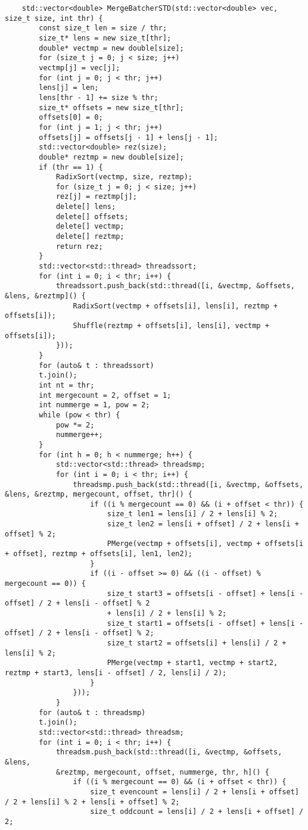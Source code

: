 \documentclass{report}
\begin{document}
\begin{lstlisting}
	std::vector<double> MergeBatcherSTD(std::vector<double> vec, size_t size, int thr) {
		const size_t len = size / thr;
		size_t* lens = new size_t[thr];
		double* vectmp = new double[size];
		for (size_t j = 0; j < size; j++)
		vectmp[j] = vec[j];
		for (int j = 0; j < thr; j++)
		lens[j] = len;
		lens[thr - 1] += size % thr;
		size_t* offsets = new size_t[thr];
		offsets[0] = 0;
		for (int j = 1; j < thr; j++)
		offsets[j] = offsets[j - 1] + lens[j - 1];
		std::vector<double> rez(size);
		double* reztmp = new double[size];
		if (thr == 1) {
			RadixSort(vectmp, size, reztmp);
			for (size_t j = 0; j < size; j++)
			rez[j] = reztmp[j];
			delete[] lens;
			delete[] offsets;
			delete[] vectmp;
			delete[] reztmp;
			return rez;
		}
		std::vector<std::thread> threadssort;
		for (int i = 0; i < thr; i++) {
			threadssort.push_back(std::thread([i, &vectmp, &offsets, &lens, &reztmp]() {
				RadixSort(vectmp + offsets[i], lens[i], reztmp + offsets[i]);
				Shuffle(reztmp + offsets[i], lens[i], vectmp + offsets[i]);
			}));
		}
		for (auto& t : threadssort)
		t.join();
		int nt = thr;
		int mergecount = 2, offset = 1;
		int nummerge = 1, pow = 2;
		while (pow < thr) {
			pow *= 2;
			nummerge++;
		}
		for (int h = 0; h < nummerge; h++) {
			std::vector<std::thread> threadsmp;
			for (int i = 0; i < thr; i++) {
				threadsmp.push_back(std::thread([i, &vectmp, &offsets, &lens, &reztmp, mergecount, offset, thr]() {
					if ((i % mergecount == 0) && (i + offset < thr)) {
						size_t len1 = lens[i] / 2 + lens[i] % 2;
						size_t len2 = lens[i + offset] / 2 + lens[i + offset] % 2;
						PMerge(vectmp + offsets[i], vectmp + offsets[i + offset], reztmp + offsets[i], len1, len2);
					}
					if ((i - offset >= 0) && ((i - offset) % mergecount == 0)) {
						size_t start3 = offsets[i - offset] + lens[i - offset] / 2 + lens[i - offset] % 2
						+ lens[i] / 2 + lens[i] % 2;
						size_t start1 = offsets[i - offset] + lens[i - offset] / 2 + lens[i - offset] % 2;
						size_t start2 = offsets[i] + lens[i] / 2 + lens[i] % 2;
						PMerge(vectmp + start1, vectmp + start2, reztmp + start3, lens[i - offset] / 2, lens[i] / 2);
					}
				}));
			}
		for (auto& t : threadsmp)
		t.join();
		std::vector<std::thread> threadsm;
		for (int i = 0; i < thr; i++) {
			threadsm.push_back(std::thread([i, &vectmp, &offsets, &lens,
			&reztmp, mergecount, offset, nummerge, thr, h]() {
				if ((i % mergecount == 0) && (i + offset < thr)) {
					size_t evencount = lens[i] / 2 + lens[i + offset] / 2 + lens[i] % 2 + lens[i + offset] % 2;
					size_t oddcount = lens[i] / 2 + lens[i + offset] / 2;

\end{lstlisting}
\end{document}

